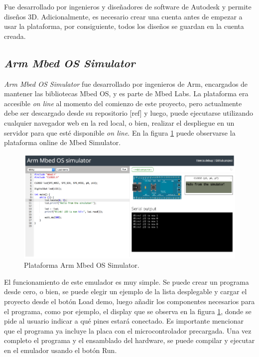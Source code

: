 Fue desarrollado por ingenieros y diseñadores de software de Autodesk \citep{Autodesk} y permite diseños 3D. Adicionalmente, es necesario crear una cuenta  antes de empezar a usar la plataforma, por consiguiente, todos los diseños se guardan en la cuenta creada. 

\subsection{\textit{Arm Mbed OS Simulator}}

\textit{Arm Mbed OS Simulator} \citep{ArmMbedSim} fue desarrollado por ingenieros de Arm, encargados de mantener las bibliotecas Mbed OS, \citep{ArmMbed} y es parte de Mbed Labs. La plataforma era accesible \textit{on line} al momento del comienzo de este proyecto, pero actualmente debe ser descargado desde su repositorio [ref] y luego, puede ejecutarse utilizando cualquier navegador web en la red local, o bien, realizar el despliegue en un servidor para que esté disponible \textit{on line}. En la figura \ref{fig:ArmMbed} puede observarse la plataforma online de Mbed Simulator.

\begin{figure}[ht]
	\centering
	\includegraphics[scale=.44]{./Figures/ArmMbed.png}
	\caption{Plataforma Arm Mbed OS Simulator.}
	\label{fig:ArmMbed}
\end{figure}

El funcionamiento de este emulador es muy simple. Se puede crear un programa desde cero, o bien, se puede elegir un ejemplo de la lista desplegable y cargar el proyecto desde el botón \textquotedbl Load demo\textquotedbl, luego añadir los componentes necesarios para el programa, como por ejemplo, el display que se observa en la figura \ref{fig:ArmMbed}, donde se pide al usuario indicar a qué pines estará conectado. Es importante mencionar que el programa ya incluye la placa con el microcontrolador precargada. Una vez completo el programa y el ensamblado del hardware, se puede compilar y ejecutar en el emulador usando el botón \textquotedbl Run\textquotedbl.


